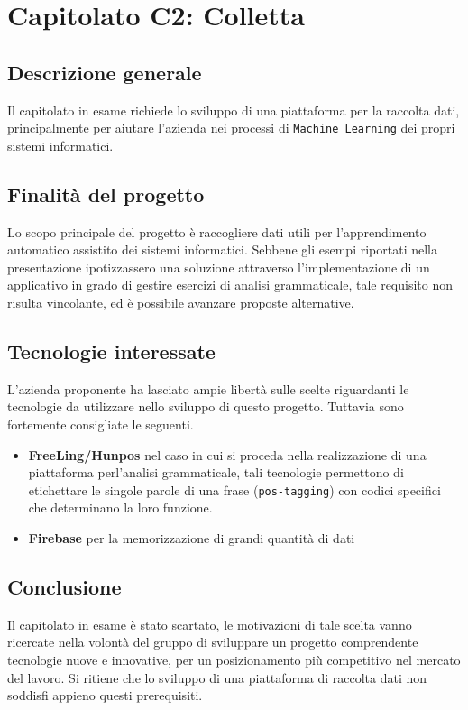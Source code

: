 \chapter{Capitolato C2: Colletta}
\section{Descrizione generale}
Il capitolato in esame richiede lo sviluppo di una piattaforma per la raccolta dati, principalmente per aiutare l'azienda nei processi di \texttt{Machine Learning} dei propri sistemi informatici.

\section{Finalit\`a del progetto}
Lo scopo principale del progetto è raccogliere dati utili per l'apprendimento automatico assistito dei sistemi informatici. Sebbene gli esempi riportati nella presentazione ipotizzassero una soluzione attraverso l'implementazione di un applicativo in grado di gestire esercizi di analisi grammaticale, tale requisito non risulta vincolante, ed è possibile avanzare proposte alternative.

\section{Tecnologie interessate}
L'azienda proponente ha lasciato ampie libertà sulle scelte riguardanti le tecnologie da utilizzare nello sviluppo di questo progetto. Tuttavia sono fortemente consigliate le seguenti.
\begin{itemize}
	\item \textbf{FreeLing/Hunpos} nel caso in cui si proceda nella realizzazione di una piattaforma perl'analisi grammaticale, tali tecnologie permettono di etichettare le singole parole di una frase (\texttt{pos-tagging}) con codici specifici che determinano la loro funzione.
	\item \textbf{Firebase} per la memorizzazione di grandi quantità di dati
\end{itemize}
\section{Conclusione}
Il capitolato in esame è stato scartato, le motivazioni di tale scelta vanno ricercate nella volontà del gruppo di sviluppare un progetto comprendente tecnologie nuove e innovative, per un posizionamento più competitivo nel mercato del lavoro. Si ritiene che lo sviluppo di una piattaforma di raccolta dati non soddisfi appieno questi prerequisiti. 